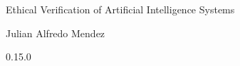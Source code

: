 \documentclass[12pt,a4paper]{book}
\begin{document}
    \begin{center}

        \phantom{H}

        \vspace{80mm}

        {\huge{Ethical Verification of Artificial Intelligence Systems}}

        \vspace{80mm}
        Julian Alfredo Mendez

        \vspace{10mm}
        0.15.0

    \end{center}

    \newpage

    \tableofcontents

    
    

    
    
    

    \appendix
    
    

    
    
\end{document}
